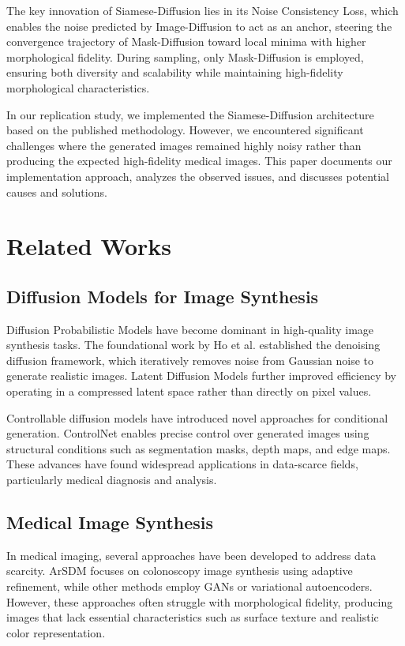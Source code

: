 \documentclass[conference]{IEEEtran}
\begin{document}
The key innovation of Siamese-Diffusion lies in its Noise Consistency Loss, which enables the noise predicted by Image-Diffusion to act as an anchor, steering the convergence trajectory of Mask-Diffusion toward local minima with higher morphological fidelity. During sampling, only Mask-Diffusion is employed, ensuring both diversity and scalability while maintaining high-fidelity morphological characteristics.

In our replication study, we implemented the Siamese-Diffusion architecture based on the published methodology. However, we encountered significant challenges where the generated images remained highly noisy rather than producing the expected high-fidelity medical images. This paper documents our implementation approach, analyzes the observed issues, and discusses potential causes and solutions.

\section{Related Works}

\subsection{Diffusion Models for Image Synthesis}
Diffusion Probabilistic Models have become dominant in high-quality image synthesis tasks. The foundational work by Ho et al. established the denoising diffusion framework, which iteratively removes noise from Gaussian noise to generate realistic images. Latent Diffusion Models further improved efficiency by operating in a compressed latent space rather than directly on pixel values.

Controllable diffusion models have introduced novel approaches for conditional generation. ControlNet enables precise control over generated images using structural conditions such as segmentation masks, depth maps, and edge maps. These advances have found widespread applications in data-scarce fields, particularly medical diagnosis and analysis.

\subsection{Medical Image Synthesis}
In medical imaging, several approaches have been developed to address data scarcity. ArSDM focuses on colonoscopy image synthesis using adaptive refinement, while other methods employ GANs or variational autoencoders. However, these approaches often struggle with morphological fidelity, producing images that lack essential characteristics such as surface texture and realistic color representation.
\end{document}
